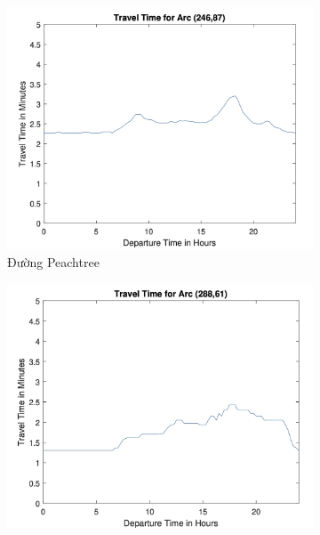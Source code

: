 \documentclass[../main.tex]{subfiles}
\begin{document}

\begin{figure}
    \centering
    \begin{subfigure}{0.45\textwidth}
        \centering
        \includegraphics{edited-images/Figure15a.jpg}
        \caption{Đường Peachtree}
        \label{fig:15a}
    \end{subfigure}
    \begin{subfigure}{0.45\textwidth}
        \centering
        \includegraphics{edited-images/Figure15b.jpg}

\end{subfigure}
\end{figure}
\end{document}
